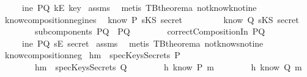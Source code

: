 \begin{isabellebody}
\ \ \ \ {\isachardoublequoteopen}{\isasymnot}\ {\isacharparenleft}ine\ PQ\ {\isacharparenleft}kE\ key{\isacharparenright}{\isacharparenright}{\isachardoublequoteclose}\isanewline
%
\isadelimproof
%
\endisadelimproof
%
\isatagproof
{}\isamarkupfalse%
\ assms\ \isamarkupfalse%
\ {\isacharparenleft}metis\ TBtheorem{}a\ not{\isacharunderscore}know{\isacharunderscore}k{\isacharunderscore}not{\isacharunderscore}ine{\isacharparenright}%
\endisatagproof
{\isafoldproof}%
%
\isadelimproof
\isanewline
%
\endisadelimproof
\isanewline
{}\isamarkupfalse%
\ know{\isacharunderscore}composition{\isacharunderscore}neg{\isacharunderscore}ine{\isacharunderscore}s{\isacharcolon}\isanewline
{}\ {\isachardoublequoteopen}{\isasymnot}\ know\ P\ {\isacharparenleft}sKS\ secret{\isacharparenright}{\isachardoublequoteclose}\isanewline
\ \ \ \ \ \ \ \ {\isachardoublequoteopen}{\isasymnot}\ know\ Q\ {\isacharparenleft}sKS\ secret{\isacharparenright}{\isachardoublequoteclose}\isanewline
\ \ \ \ \ \ \ \ {\isachardoublequoteopen}subcomponents\ PQ\ {\isacharequal}\ {\isacharbraceleft}P{\isacharcomma}Q{\isacharbraceright}{\isachardoublequoteclose}\isanewline
\ \ \ \ \ \ \ \ {\isachardoublequoteopen}correctCompositionIn\ PQ{\isachardoublequoteclose}\isanewline
{}\ \ \ \ {\isachardoublequoteopen}{\isasymnot}\ {\isacharparenleft}ine\ PQ\ {\isacharparenleft}sE\ secret{\isacharparenright}{\isacharparenright}{\isachardoublequoteclose}\isanewline
%
\isadelimproof
%
\endisadelimproof
%
\isatagproof
{}\isamarkupfalse%
\ assms\ \isamarkupfalse%
\ {\isacharparenleft}metis\ TBtheorem{}a\ not{\isacharunderscore}know{\isacharunderscore}s{\isacharunderscore}not{\isacharunderscore}ine{\isacharparenright}%
\endisatagproof
{\isafoldproof}%
%
\isadelimproof
\isanewline
%
\endisadelimproof
\isanewline
{}\isamarkupfalse%
\ know{\isacharunderscore}composition{\isacharunderscore}neg{}{\isacharcolon}\isanewline
{}\ h{}{\isacharcolon}{\isachardoublequoteopen}m\ {\isasymnotin}\ specKeysSecrets\ P{\isachardoublequoteclose}\isanewline
\ \ \ \ \ \ \ \ h{}{\isacharcolon}{\isachardoublequoteopen}m\ {\isasymnotin}\ specKeysSecrets\ Q{\isachardoublequoteclose}\isanewline
\ \ \ \ \ \ \ \ h{}{\isacharcolon}{\isachardoublequoteopen}{\isasymnot}\ know\ P\ m{\isachardoublequoteclose}\isanewline
\ \ \ \ \ \ \ \ h{}{\isacharcolon}{\isachardoublequoteopen}{\isasymnot}\ know\ Q\ m{\isachardoublequoteclose}\isanewline

\end{isabellebody}
